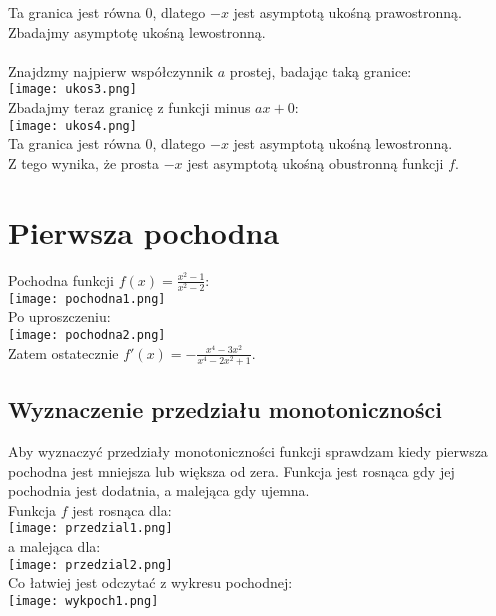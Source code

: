 \documentclass[a4paper,10pt]{article}
\begin{document}
Ta granica jest równa 0, dlatego $-x$ jest asymptotą ukośną prawostronną.\\

Zbadajmy asymptotę ukośną lewostronną.\\ \\
Znajdzmy najpierw współczynnik $a$ prostej, badając taką granice:\\
\texttt{[image: ukos3.png]}\\
Zbadajmy teraz granicę z funkcji minus $ax + 0$:\\
\texttt{[image: ukos4.png]}\\

Ta granica jest równa 0, dlatego $-x$ jest asymptotą ukośną lewostronną.\\

Z tego wynika, że prosta $-x$ jest asymptotą ukośną obustronną funkcji $f$.

\section{Pierwsza pochodna}
Pochodna funkcji $ f(x)=\frac{x^2-1}{x^2-2} $:\\
\texttt{[image: pochodna1.png]}\\
Po uproszczeniu:\\
\texttt{[image: pochodna2.png]}\\

Zatem ostatecznie $ f'(x)=-\frac{x^4-3x^2}{x^4-2x^2+1} $.\\

\subsection{Wyznaczenie przedziału monotoniczności}
Aby wyznaczyć przedziały monotoniczności funkcji sprawdzam kiedy pierwsza pochodna jest mniejsza lub większa od zera. Funkcja jest rosnąca gdy jej pochodnia jest dodatnia, a malejąca gdy ujemna.\\

Funkcja $f$ jest rosnąca dla:\\
\texttt{[image: przedzial1.png]}\\

a  malejąca dla:\\
\texttt{[image: przedzial2.png]}\\

Co łatwiej jest odczytać z wykresu pochodnej:\\
\texttt{[image: wykpoch1.png]}
\end{document}
